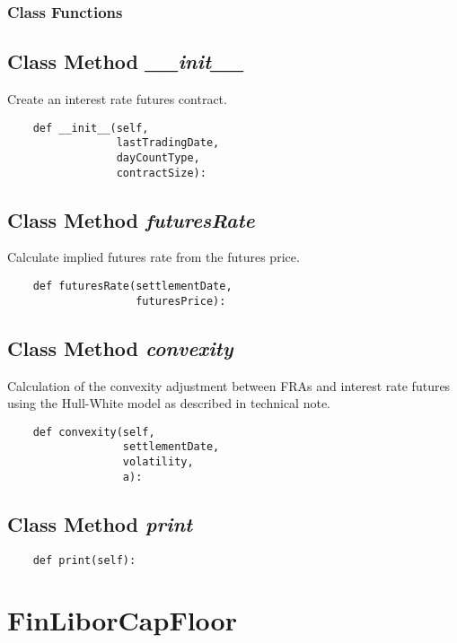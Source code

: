 \documentclass[twoside,11pt]{book}
\begin{document}
\subsubsection{Class Functions}

\subsection{Class Method {\it \_\_init\_\_}}
Create an interest rate futures contract.

\begin{lstlisting}
    def __init__(self, 
                 lastTradingDate,
                 dayCountType,
                 contractSize):
\end{lstlisting}

\subsection{Class Method {\it futuresRate}}
Calculate implied futures rate from the futures price.

\begin{lstlisting}
    def futuresRate(settlementDate,
                    futuresPrice):
\end{lstlisting}

\subsection{Class Method {\it convexity}}
Calculation of the convexity adjustment between FRAs and interest rate futures using the Hull-White model as described in technical note. 

\begin{lstlisting}
    def convexity(self, 
                  settlementDate,
                  volatility, 
                  a):
\end{lstlisting}

\subsection{Class Method {\it print}}


\begin{lstlisting}
    def print(self):
\end{lstlisting}

\newpage
\section{FinLiborCapFloor}
\end{document}
